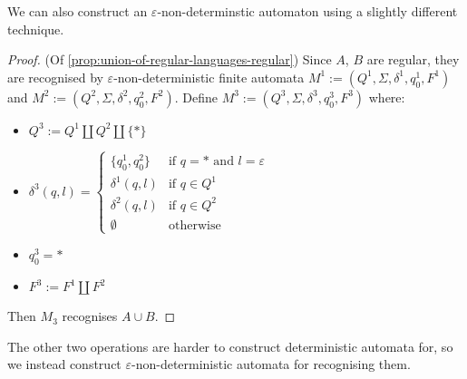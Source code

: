 \documentclass{article}
\theoremstyle{break}
\begin{document}
We can also construct an $\varepsilon$-non-determinstic automaton using a slightly different technique.

\begin{proof}(Of \ref{prop:union-of-regular-languages-regular})
\label{prf:union-of-regular-languages-regular-ep}
Since $A$, $B$ are regular, they are recognised by $\varepsilon$-non-deterministic finite automata $M^1:=(Q^1,\Sigma,\delta^1,q^1_0,F^1)$ and $M^2:=(Q^2,\Sigma,\delta^2,q^2_0,F^2)$.
Define $M^3:=(Q^3,\Sigma,\delta^3,q^3_0,F^3)$ where:
\begin{itemize}
  \item $Q^3 := Q^1 \coprod Q^2 \coprod \{\ast\}$
  \item $\delta^3(q,l) = \begin{cases}
  \{q^1_0, q^2_0\} & \text{if } q=\ast \text{ and } l = \varepsilon \\
  \delta^1(q,l) & \text{if } q\in Q^1 \\
  \delta^2(q,l) & \text{if } q\in Q^2 \\
  \emptyset & \text{otherwise} 
\end{cases}$
  \item $q^3_0 = \ast$
  \item $F^3 := F^1 \coprod F^2$
\end{itemize}
Then $M_3$ recognises $A\cup B$.
\end{proof}

The other two operations are harder to construct deterministic automata for, so we instead construct $\varepsilon$-non-deterministic automata for recognising them.
\end{document}
